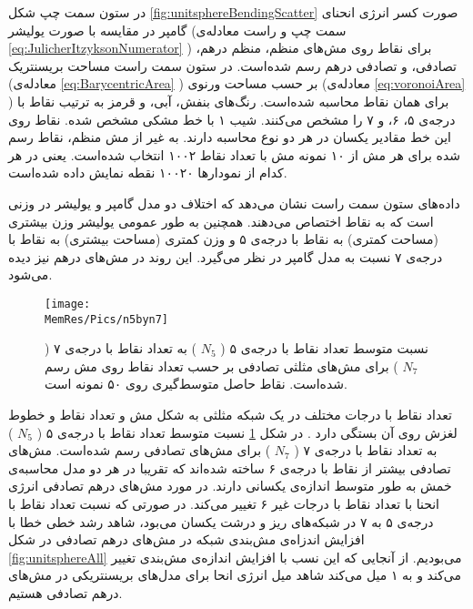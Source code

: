 در ستون سمت چپ شکل 
\ref{fig:unitsphereBendingScatter}
صورت کسر انرژی انحنای گامپر در مقایسه با صورت یولیشر (سمت چپ و راست معادله‌ی 
\ref{eq:JulicherItzyksonNumerator}
) برای نقاط روی مش‌های منظم، منظم درهم، تصادفی، و تصادفی درهم رسم شده‌است. در ستون سمت راست مساحت بریسنتریک (معادله‌ی 
\ref{eq:BarycentricArea}
) بر حسب مساحت ورنوی (معادله‌ی
\ref{eq:voronoiArea}
) برای همان نقاط محاسبه شده‌است. رنگ‌های بنفش، آبی،‌ و قرمز به ترتیب نقاط با درجه‌ی ۵، ۶، و ۷  را مشخص می‌کنند. شیب ۱ با خط مشکی مشخص شده. نقاط روی این خط مقادیر یکسان در هر دو نوع محاسبه دارند. به غیر از مش منظم،‌ نقاط رسم شده برای هر مش از ۱۰ نمونه مش با تعداد نقاط ۱۰۰۲ انتخاب شده‌است. یعنی در هر کدام از نمودارها ۱۰۰۲۰ نقطه نمایش داده شده‌است.

داده‌های ستون سمت راست نشان می‌دهد که اختلاف دو مدل گامپر و یولیشر  در  وزنی است که به نقاط اختصاص می‌دهند. همچنین به طور عمومی یولیشر وزن بیشتری (مساحت کمتری) به نقاط با درجه‌ی ۵ و وزن کمتری (مساحت بیشتری) به نقاط با درجه‌ی ۷ نسبت به مدل گامپر در نظر می‌گیرد. این روند در مش‌های درهم نیز دیده می‌شود.

\begin{figure}[htbp]
\begin{center}
\texttt{[image: \\MemRes/Pics/n5byn7]}
\caption{
نسبت متوسط تعداد نقاط با درجه‌ی ۵ (
$N_5$
) به تعداد نقاط با درجه‌ی ۷ (
$N_7$
) برای مش‌های مثلثی تصادفی بر حسب تعداد نقاط روی مش رسم شده‌است. نقاط حاصل متوسط‌گیری روی ۵۰ نمونه است.
}
\label{fig:n5n7}
\end{center}
\end{figure}


تعداد نقاط با درجات مختلف در یک شبکه مثلثی به شکل مش و تعداد نقاط  و خطوط لغزش روی آن بستگی دارد 
\cite{Nelson2000PRB}
. در شکل
\ref{fig:n5n7}
نسبت متوسط تعداد نقاط با درجه‌ی ۵ (
$N_5$
) به تعداد نقاط با درجه‌ی ۷ (
$N_7$
) برای مش‌های تصادفی رسم شده‌است. مش‌های تصادفی بیشتر از نقاط با درجه‌ی ۶ ساخته شده‌اند که تقریبا در هر دو مدل محاسبه‌ی خمش به طور متوسط اندازه‌ی یکسانی دارند. در مورد مش‌های درهم تصادفی انرژی انحنا با تعداد نقاط با درجات غیر ۶ تغییر می‌کند. در صورتی که نسبت تعداد نقاط با درجه‌ی ۵ به ۷ در شبکه‌های ریز و درشت یکسان می‌بود، شاهد رشد خطی خطا با افزایش اندزاه‌ی مش‌بندی شبکه‌ در مش‌های درهم تصادفی در شکل 
\ref{fig:unitsphereAll}
می‌بودیم. از آنجایی که این نسب با افزایش اندازه‌ی مش‌بندی تغییر می‌کند و به ۱ میل می‌کند شاهد میل‌ انرژی انحا برای مدل‌های بریسنتریکی در مش‌های درهم تصادفی هستیم.



